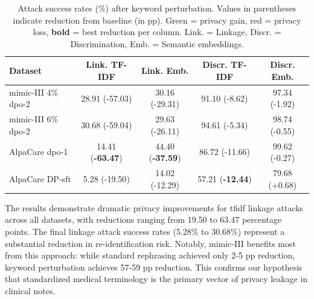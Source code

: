 \begin{table}[h]
\centering
\small
\begin{tabular}{lcccc}
\toprule
\textbf{Dataset} & \textbf{Link. TF-IDF} & \textbf{Link. Emb.} & \textbf{Discr. TF-IDF} & \textbf{Discr. Emb.} \\
\midrule
\gls{mimic}-III 4\% \gls{dpo}-2 & 28.91 {\scriptsize(\textcolor{green!50!black}{-57.03})} & 30.16 {\scriptsize(\textcolor{green!50!black}{-29.31})} & 91.10 {\scriptsize(\textcolor{green!50!black}{-8.62})} & 97.34 {\scriptsize(\textcolor{green!50!black}{-1.92})} \\
\gls{mimic}-III 6\% \gls{dpo}-2 & 30.68 {\scriptsize(\textcolor{green!50!black}{-59.04})} & 29.63 {\scriptsize(\textcolor{green!50!black}{-26.11})} & 94.61 {\scriptsize(\textcolor{green!50!black}{-5.34})} & 98.74 {\scriptsize(\textcolor{green!50!black}{-0.55})} \\
AlpaCare \gls{dpo}-1 & 14.41 {\scriptsize(\textbf{\textcolor{green!50!black}{-63.47}})} & 44.40 {\scriptsize(\textbf{\textcolor{green!50!black}{-37.59}})} & 86.72 {\scriptsize(\textcolor{green!50!black}{-11.66})} & 99.62 {\scriptsize(\textcolor{green!50!black}{-0.27})} \\
AlpaCare DP-\gls{sft} & 5.28 {\scriptsize(\textcolor{green!50!black}{-19.50})} & 14.02 {\scriptsize(\textcolor{green!50!black}{-12.29})} & 57.21 {\scriptsize(\textbf{\textcolor{green!50!black}{-12.44}})} & 79.68 {\scriptsize(\textcolor{red!70!black}{+0.68})} \\
\bottomrule
\end{tabular}
\caption{Attack success rates (\%) after keyword perturbation. Values in parentheses indicate reduction from baseline (in pp). \textcolor{green!50!black}{Green} = privacy gain, \textcolor{red!70!black}{red} = privacy loss, \textbf{bold} = best reduction per column. Link. = Linkage, Discr. = Discrimination, Emb. = Semantic embeddings.}
\label{tab:keyword_results}
\end{table}

The results demonstrate dramatic privacy improvements for \gls{tfidf} linkage attacks across all datasets, with reductions ranging from 19.50 to 63.47 percentage points. The final linkage attack success rates (5.28\% to 30.68\%) represent a substantial reduction in re-identification risk. Notably, \gls{mimic}-III benefits most from this approach: while standard rephrasing achieved only 2-5 pp reduction, keyword perturbation achieves 57-59 pp reduction. This confirms our hypothesis that standardized medical terminology is the primary vector of privacy leakage in clinical notes.

